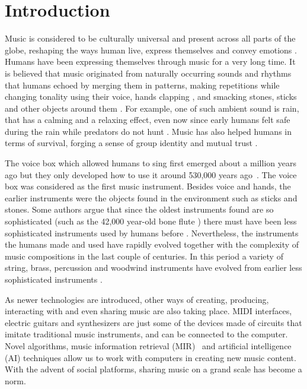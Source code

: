 \documentclass[sigchi]{acmart}
\begin{document}
\section{Introduction}
Music is considered to be culturally universal \cite{campbell1997music, seeger1971reflections} and present across all parts of the globe, reshaping the ways human live, express themselves and convey emotions  \cite{juslin2001music,montagu2017music}. Humans have been expressing themselves through music for a very long time.  It is believed that music originated from naturally occurring sounds and rhythms that humans echoed by merging them in patterns, making repetitions while changing tonality using their voice, hands clapping \cite{kassler1987dancing}, and smacking stones, sticks and other objects around them \cite{montagu2014horns}. For example, one of such ambient sound is rain, that has a calming and a relaxing effect, even now since early humans felt safe during the rain while predators do not hunt \cite{aramaki2017bridging}. Music has also helped humans 
in terms of survival, forging a sense of group identity and mutual trust \cite{conard2009new}.

The voice box which allowed humans to sing first emerged about a million years \cite{montagu2017music} ago but they only developed how to use it around 530,000 years ago~\cite{morley2013prehistory}. The voice box was considered as the first music instrument. Besides voice and hands, the earlier instruments were the objects found in the environment such as sticks and stones. Some authors argue that since the oldest instruments found are so sophisticated (such as the 42,000 year-old bone flute \cite{higham2012tauesting,wallin2001origins,conard2009new}) there must have been less sophisticated instruments used by humans before \cite{conard2009new,morley2013prehistory}. Nevertheless, the instruments the humans made and used have rapidly evolved together with the complexity of music compositions in the last couple of centuries. In this period a variety of string, brass, percussion and woodwind instruments have evolved from earlier less sophisticated instruments \cite{conard2009female}.

As newer technologies are introduced, other ways of creating, producing, interacting with and even sharing music \cite{voida2005listening} are also taking place. MIDI interfaces, electric guitars and synthesizers are just some of the devices made of circuits that imitate traditional music instruments, and can be connected to the computer. Novel algorithms, music information retrieval (MIR)~\cite{downie2008music,downie2003music} and artificial intelligence (AI) techniques allow us to work with computers in creating new music content. With the advent of social platforms, sharing music on a grand scale has become a norm.
\end{document}
